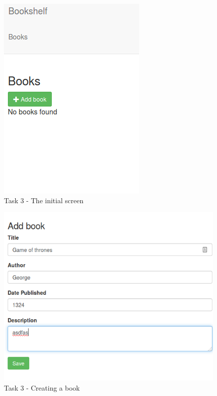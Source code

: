 \documentclass{article}
\makeatletter
\def\maxwidth#1{\ifdim\Gin@nat@width>#1 #1\else\Gin@nat@width\fi}
\makeatother
\begin{document}
	\begin{figure}[ht]
		\includegraphics[width=\maxwidth{5in}]{img/t3s1.png}
		\centering
		\caption{Task 3 - The initial screen}
	\end{figure}
	\begin{figure}[ht]
		\includegraphics[width=\maxwidth{5in}]{img/t3s2.png}
		\centering
        \caption{Task 3 - Creating a book}
	\end{figure}
\end{document}
